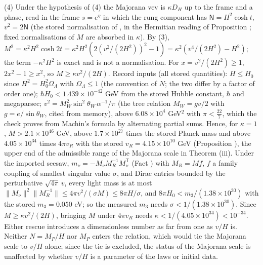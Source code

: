 (4) Under the hypothesis of (4) the Majorana vev is $\kappa D_{H}$ up to the frame and a phase, read in the frame $s = e^{\eta}$ in which the rung component has $\mathsf{N} = H^{2}\cosh t$, $v^{2} = 2\mathsf{N}$ (the stored normalisation of , in the Hermitian reading of Proposition ; fixed normalisations of $M$ are absorbed in $\kappa$). By (3), $M^{2} = \kappa^{2}H^{2}\cosh 2t = \kappa^{2}H^{2}(2(v^{2}/(2H^{2}))^{2} - 1) = \kappa^{2}(v^{4}/(2H^{2}) - H^{2})$; the term $-\kappa^{2}H^{2}$ is exact and is not a normalisation. For $x = v^{2}/(2H^{2}) \ge 1$, $2x^{2} - 1 \ge x^{2}$, so $M \ge \kappa v^{2}/(2H)$. Record inputs (all stored quantities): $H \le H_{0}$ since $H^{2} = H_{0}^{2}\Omega_{\Lambda}$ with $\Omega_{\Lambda} \le 1$ (the convention of $N$; the two differ by a factor of order one); $\hbar H_{0} < 1.439 \times 10^{-42}$ GeV from the stored Hubble constant, $\hbar$ and megaparsec; $v^{2} = M_{W}^{2}\sin^{2}\theta_{W}\,\alpha^{-1}/\pi$ (the tree relation $M_{W} = gv/2$ with $g = e/\sin\theta_{W}$, cited from memory), above $6.08 \times 10^{4}$ GeV$^{2}$ with $\pi < \tfrac{22}{7}$, which the check proves from Machin's formula by alternating partial sums. Hence, for $\kappa = 1$, $M > 2.1 \times 10^{46}$ GeV, above $1.7 \times 10^{27}$ times the stored Planck mass and above $4.05 \times 10^{34}$ times $4\pi v_{R}$ with the stored $v_{R} = 4.15 \times 10^{10}$ GeV (Proposition ), the upper end of the admissible range of the Majorana scale in Theorem (iii). Under the imported seesaw, $m_{\nu} = -M_{\nu}M_{R}^{-1}M_{\nu}^{\mathsf{T}}$ (Fact ) with $M_{R} = Mf$, $f$ a family coupling of smallest singular value $\sigma$, and Dirac entries bounded by the perturbative $\sqrt{4\pi}\,v$, every light mass is at most $\|M_{\nu}\|^{2}\|M_{R}^{-1}\| \le 4\pi v^{2}/(\sigma M) \le 8\pi H/\sigma$, and $8\pi H_{0} < m_{3}/(1.38 \times 10^{30})$ with the stored $m_{3} = 0.050$ eV; so the measured $m_{3}$ needs $\sigma < 1/(1.38 \times 10^{30})$. Since $M \ge \kappa v^{2}/(2H)$, bringing $M$ under $4\pi v_{R}$ needs $\kappa < 1/(4.05 \times 10^{34}) < 10^{-34}$. Either rescue introduces a dimensionless number as far from one as $v/H$ is. Neither $N = M_{P}/H$ nor $M_{P}$ enters the relation, which would tie the Majorana scale to $v/H$ alone; since the tie is excluded, the status of the Majorana scale is unaffected by whether $v/H$ is a parameter of the laws or initial data.

